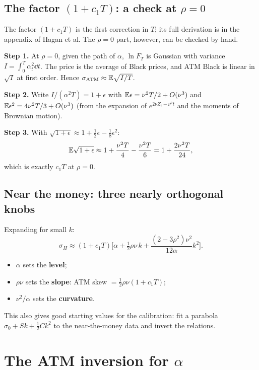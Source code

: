 \subsection{\texorpdfstring{The factor $(1+c_1T)$: a check at $\rho=0$}{The factor (1+c₁T): a check at ρ=0}}
The factor $(1+c_1T)$ is the first correction in $T$; its full derivation is in the appendix of Hagan et al. The
$\rho=0$ part, however, can be checked by hand.

\noindent\textbf{Step 1.} At $\rho=0$, given the path of $\alpha$, $\ln F_T$ is Gaussian with variance
$I=\int_0^T\alpha_t^2\dd t$. The price is the average of Black prices, and ATM Black is linear in $\sqrt I$ at first
order. Hence $\sigma_{\mathrm{ATM}}\approx\mathbb{E}\sqrt{I/T}$.

\noindent\textbf{Step 2.} Write $I/(\alpha^2T)=1+\epsilon$ with $\mathbb{E}\epsilon=\nu^2T/2+O(\nu^3)$ and
$\mathbb{E}\epsilon^2=4\nu^2T/3+O(\nu^3)$ (from the expansion of $e^{2\nu Z_t-\nu^2t}$ and the moments of Brownian motion).

\noindent\textbf{Step 3.} With $\sqrt{1+\epsilon}\approx1+\tfrac12\epsilon-\tfrac18\epsilon^2$:
\[
\mathbb{E}\sqrt{1+\epsilon}\approx1+\frac{\nu^2T}{4}-\frac{\nu^2T}{6}=1+\frac{2\nu^2T}{24},
\]
which is exactly $c_1T$ at $\rho=0$.

\subsection{Near the money: three nearly orthogonal knobs}
Expanding for small $k$:
\begin{equation}\label{eq:sabr-taylor}
\sigma_H\approx(1+c_1T)\Big[\alpha+\tfrac12\rho\nu\,k+\frac{(2-3\rho^2)\nu^2}{12\alpha}k^2\Big].
\end{equation}
\begin{itemize}
\item $\alpha$ sets the \textbf{level};
\item $\rho\nu$ sets the \textbf{slope}: ATM skew $=\tfrac12\rho\nu(1+c_1T)$;
\item $\nu^2/\alpha$ sets the \textbf{curvature}.
\end{itemize}
This also gives good starting values for the calibration: fit a parabola $\sigma_0+Sk+\tfrac12Ck^2$ to the
near-the-money data and invert the relations.

\section{\texorpdfstring{The ATM inversion for $\alpha$}{The ATM inversion for α}}
